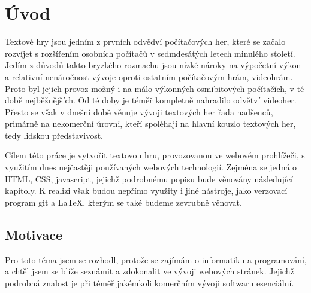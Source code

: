 \documentclass[main.tex]{subfiles}
\begin{document}
\section{Úvod}
 Textové hry jsou jedním z prvních odvědví počítačových her, které se začalo rozvíjet s rozšířením osobních počítačů v sedmdesátých letech minulého století. Jedím z důvodů takto bryzkého rozmachu jsou nízké nároky na výpočetní výkon a relativní nenáročnost vývoje oproti ostatním počítačovým hrám, videohrám. Proto byl jejich provoz možný i na málo výkonných osmibitových počítačích, v té době nejběžnějších.
 Od té doby je téměř kompletně nahradilo odvětví videoher. Přesto se však v dnešní době věnuje vývoji textových her řada nadšenců, primárně na nekomerční úrovni, kteří spoléhají na hlavní kouzlo textových her, tedy lidskou představivost.

Cílem této práce je vytvořit textovou hru, provozovanou ve webovém prohlížeči, s využitím dnes nejčastěji používaných webových technologií. Zejména se jedná o HTML, CSS, javascript, jejichž podrobnému popisu bude věnovány následující kapitoly. K realizi však budou nepřímo využity i jiné nástroje, jako verzovací program git a \LaTeX, kterým se také budeme zevrubně věnovat.

\subsection{Motivace}
Pro toto téma jsem se rozhodl, protože se zajímám o informatiku a programování, a chtěl jsem se blíže seznámit a zdokonalit ve vývoji webových stránek. Jejichž podrobná znalost je při téměř jakémkoli komerčním vývoji softwaru esenciální.
\end{document}
